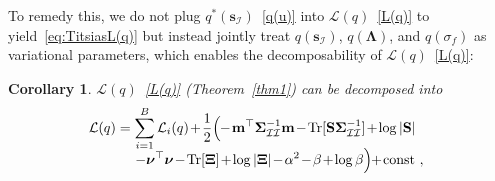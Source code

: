 \documentclass[conference]{IEEEtran}
\newtheorem{corollary}{Corollary}
\begin{document}
	To remedy this, we do not  plug $q^*(\mathbf{s}_\mathcal{I})$~\eqref{q(u)} into $\mathcal{L}(q)$~\eqref{L(q)} to yield~\eqref{eq:TitsiasL(q)} but
	instead jointly treat $q(\mathbf{s}_\mathcal{I})$, $q(\mathbf{\Lambda})$, and $q(\sigma_f)$ as variational parameters, which enables the decomposability of $\mathcal{L}(q)$~\eqref{L(q)}:\vspace{1mm}
%
\begin{corollary} $\mathcal{L}(q)$~\eqref{L(q)} (Theorem~\ref{thm1}) can be decomposed into\vspace{-0mm}	
	\begin{equation*}
		\hspace{-1.7mm}
		\begin{array}{l}
			\mathcal{L}(q)=\displaystyle\sum_{i=1}^B\mathcal{L}_i(q) \hspace{-0.5mm}+\hspace{-0.5mm} \frac{1}{2}\Big( \hspace{-1mm}-\hspace{-0.5mm}\mathbf{m}^\top\mathbf{\Sigma}_\mathcal{II}^{-1}\mathbf{m}\hspace{-0.5mm}- \hspace{-0.5mm}\mathrm{Tr}[\mathbf{S}\mathbf{\Sigma}_\mathcal{II}^{-1}]\hspace{-0.5mm}+\hspace{-0.5mm}\log|\mathbf{S}| \vspace{-0.5mm}\\
			 \quad\qquad\ \displaystyle-\boldsymbol{\nu}^\top\boldsymbol{\nu}\hspace{-0.5mm} -\hspace{-0.5mm}\mathrm{Tr}[\mathbf{\Xi}]\hspace{-0.5mm}+\hspace{-0.5mm}\log|\mathbf{\Xi}|\hspace{-0.5mm}-\hspace{-0.5mm}\alpha^2 \hspace{-0.5mm}-\hspace{-0.5mm} \beta \hspace{-0.5mm}+\hspace{-0.5mm} \log \beta\Big)\hspace{-1mm} +\hspace{-0.5mm}\mathrm{const}\ ,\\

\end{array}
\end{equation*}
\end{corollary}
\end{document}

